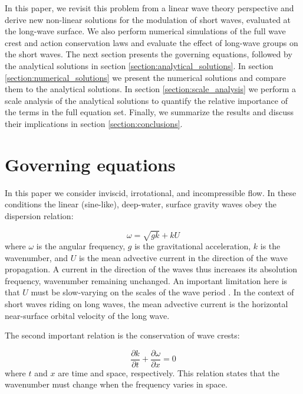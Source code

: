 \documentclass[draft]{agujournal2019}
\begin{document}
In this paper, we revisit this problem from a linear wave theory perspective and
derive new non-linear solutions for the modulation of short waves, evaluated
at the long-wave surface.
We also perform numerical simulations of the full wave crest and action
conservation laws and evaluate the effect of long-wave groups on the short waves.
The next section presents the governing equations, followed by the analytical
solutions in section \ref{section:analytical_solutions}.
In section \ref{section:numerical_solutions} we present the numerical solutions
and compare them to the analytical solutions.
In section \ref{section:scale_analysis} we perform a scale analysis of the
analytical solutions to quantify the relative importance of the terms in the
full equation set.
Finally, we summarize the results and discuss their implications in section
\ref{section:conclusions}.

\section{Governing equations}
\label{section:governing_equations}

In this paper we consider inviscid, irrotational, and incompressible flow.
In these conditions the linear (sine-like), deep-water, surface gravity waves
obey the dispersion relation:

\begin{equation}
\label{eq:dispersion}
\omega = \sqrt{gk} + k U
\end{equation}
where $\omega$ is the angular frequency, $g$ is the gravitational acceleration,
$k$ is the wavenumber, and $U$ is the mean advective current in the direction
of the wave propagation.
A current in the direction of the waves thus increases its absolution frequency,
wavenumber remaining unchanged.
An important limitation here is that $U$ must be slow-varying on the scales of
the wave period \cite{bretherton1968wavetrains}.
In the context of short waves riding on long waves, the mean advective current
is the horizontal near-surface orbital velocity of the long wave.

The second important relation is the conservation of wave crests:

\begin{equation}
\label{eq:wave_crests}
\dfrac{\partial k}{\partial t}
+ \dfrac{\partial \omega}{\partial x}
= 0
\end{equation}
where $t$ and $x$ are time and space, respectively.
This relation states that the wavenumber must change when the frequency varies
in space.
\end{document}
